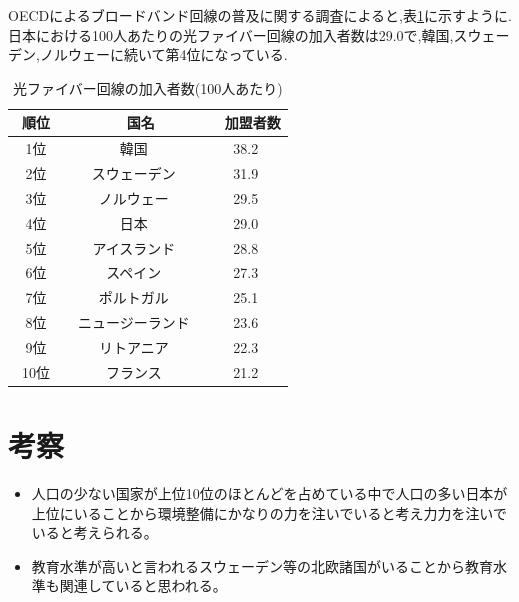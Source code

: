 \documentclass[a4paper,11pt,dvipdfmx]{ujarticle}
\begin{document}
OECDによるブロードバンド回線の普及に関する調査\cite{oecd}によると,表\ref{fig:dok}に示すように.日本における100人あたりの光ファイバー回線の加入者数は29.0で,韓国,スウェーデン,ノルウェーに続いて第4位になっている.
\begin{table}[htbp]
    \centering
    \caption{光ファイバー回線の加入者数(100人あたり)}\label{fig:dok}
    \begin{tabular}{|c|c|c|}
        \hline
        順位　&　国名　&　加盟者数 \\
        \hline
        1位  &  韓国　& 38.2 \\
        \hline
        2位  &  スウェーデン　& 31.9 \\
        \hline
        3位  &  ノルウェー　& 29.5 \\
        \hline
        4位  &  日本　& 29.0 \\
        \hline
        5位  &  アイスランド　& 28.8 \\
        \hline
        6位  &  スペイン　& 27.3 \\
        \hline
        7位  &  ポルトガル　& 25.1 \\
        \hline
        8位  &  ニュージーランド　& 23.6 \\
        \hline
        9位  &  リトアニア　& 22.3 \\
        \hline
        10位  &  フランス　& 21.2 \\
        \hline
    \end{tabular}
\end{table}

\section{考察}
\begin{itemize}
    \item 人口の少ない国家が上位10位のほとんどを占めている中で人口の多い日本が上位にいることから環境整備にかなりの力を注いでいると考え力力を注いでいると考えられる。
    \item 教育水準が高いと言われるスウェーデン等の北欧諸国がいることから教育水準も関連していると思われる。
\end{itemize}


\end{document}
